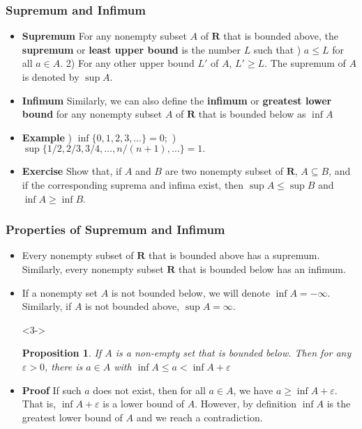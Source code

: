 \documentclass[handout]{beamer}
\newtheorem{Proposition}[theorem]{Proposition}
\begin{document}
\frame
{
  \frametitle{Supremum and Infimum}

  \begin{itemize}
  \item <1->  \textbf{Supremum} For any nonempty subset $A$ of $\mathbf{R}$ that is bounded above, the \textbf{supremum} or \textbf{least upper bound} is the number $L$ such that ) $a\leq L$ for all $a\in A$. 2) For any other upper bound $L'$ of $A$, $L'\geq L$. The supremum of $A$ is denoted by $\sup A$.

  \item <2->  \textbf{Infimum} Similarly, we can also define the \textbf{infimum} or \textbf{greatest lower bound} for any nonempty subset $A$ of $\mathbf{R}$ that is bounded below as $\inf A$ 
  
        \item<3-> \textbf{Example} ) $\inf \{0,1,2,3,\ldots\}=0;$  ) $\sup \{1/2,2/3,3/4,\ldots,n/(n+1), \ldots\}=1.$

        \item<4-> \textbf{Exercise} Show that, if $A$ and $B$ are two nonempty subset of $\mathbf{R}$, $A\subseteq B$, and if the corresponding suprema and infima exist, then $\sup A\leq \sup B$ and $\inf A\geq \inf B$.
        

        
  \end{itemize}
}



\frame
{
  \frametitle{Properties of Supremum and Infimum}

  \begin{itemize}
  
\item<1-> Every nonempty subset of $\mathbf{R}$ that is bounded above has a supremum. Similarly, every nonempty subset $\mathbf{R}$ that is bounded below has an infimum.

  
     \item <2-> If a nonempty set $A$ is not bounded below, we will denote $\inf A=-\infty$. Similarly, if $A$ is not bounded above, $\sup A=\infty$. 
   \item [] <3-> \begin{Proposition} If $A$ is a non-empty set that is bounded below. Then for any $\varepsilon>0$, there is $a\in A$ with $\inf A\leq a<\inf A+\varepsilon$\end{Proposition} 

  \item <4->  \textbf{Proof} If such $a$ does not exist, then for all $a\in A$, we have $a\geq \inf A+\varepsilon$. That is, $\inf A+\varepsilon$ is a lower bound of $A$. However, by definition $\inf A$ is the greatest lower bound of $A$ and we reach a contradiction.   
        
  \end{itemize}
}
\end{document}
